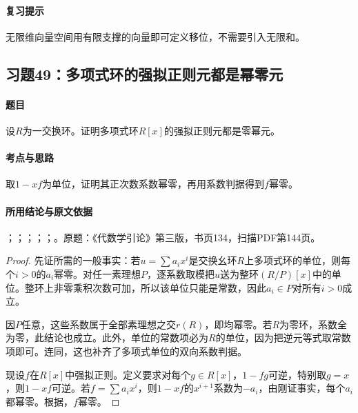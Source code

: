 \paragraph{复习提示}

无限维向量空间用有限支撑的向量即可定义移位，不需要引入无限和。



\subsection{习题49：多项式环的强拟正则元都是幂零元}

\label{ex:3:49}

\paragraph{题目}

设$R$为一交换环。证明多项式环$R[x]$的强拟正则元都是零幂元。

\paragraph{考点与思路}

取$1-xf$为单位，证明其正次数系数幂零，再用系数判据得到$f$幂零。

\paragraph{所用结论与原文依据}

；；；；；。原题：《代数学引论》第三版，书页134，扫描PDF第144页。


\begin{proof}

先证所需的一般事实：若$u=\sum a_ix^i$是交换幺环$R$上多项式环的单位，则每个$i>0$的$a_i$幂零。对任一素理想$P$，逐系数取模把$u$送为整环$(R/P)[x]$中的单位。整环上非零乘积次数可加，所以该单位只能是常数，因此$a_i\in P$对所有$i>0$成立。

因$P$任意，这些系数属于全部素理想之交$r(R)$，即均幂零。若$R$为零环，系数全为零，此结论也成立。此外，单位的常数项必为$R$的单位，因为把逆元等式取常数项即可。连同，这也补齐了多项式单位的双向系数判据。

现设$f$在$R[x]$中强拟正则。定义要求对每个$g\in R[x]$，$1-fg$可逆，特别取$g=x$，则$1-xf$可逆。若$f=\sum a_ix^i$，则$1-xf$的$x^{i+1}$系数为$-a_i$，由刚证事实，每个$a_i$都幂零。根据，$f$幂零。

\end{proof}

